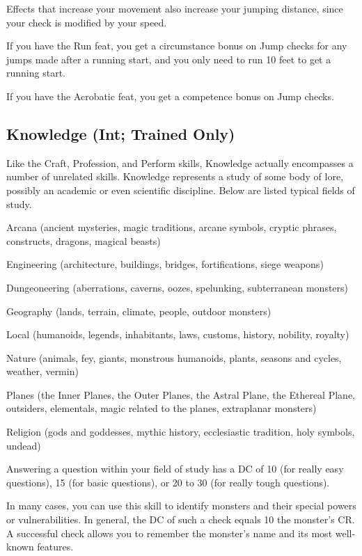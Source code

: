  Effects that increase your movement also increase your jumping distance, since your check is modified by your speed.

If you have the Run feat, you get a  circumstance bonus on Jump checks for
any jumps made after a running start, and you only need to run 10 feet to get a running start.

If you have the Acrobatic feat, you get a  competence bonus on Jump
checks.

\subsection{Knowledge (Int; Trained Only)}
Like the Craft, Profession, and Perform skills, Knowledge actually encompasses a number of unrelated skills. Knowledge represents a study of some body of lore, possibly an academic or even scientific discipline. Below are listed typical fields of study.
\begin{itemize*}
\item Arcana (ancient mysteries, magic traditions, arcane symbols,
cryptic phrases, constructs, dragons, magical beasts)
\item Engineering (architecture, buildings, bridges, fortifications, siege weapons)
\item Dungeoneering (aberrations, caverns, oozes, spelunking, subterranean monsters)
\item Geography (lands, terrain, climate, people, outdoor monsters)
\item Local (humanoids, legends, inhabitants, laws, customs, history, nobility, royalty)
\item Nature (animals, fey, giants, monstrous humanoids, plants, seasons and cycles, weather, vermin)
\item Planes (the Inner Planes, the Outer Planes, the Astral Plane,
the Ethereal Plane, outsiders, elementals, magic related to the planes, extraplanar monsters)
\item Religion (gods and goddesses, mythic history, ecclesiastic tradition, holy symbols, undead)
\end{itemize*}
 Answering a question within your field of study has a DC of 10 (for really easy questions), 15 (for basic questions), or 20 to 30 (for really tough questions).

In many cases, you can use this skill to identify monsters and their special powers or vulnerabilities. In general, the DC of such a check equals 10 \add the monster's CR. A successful check allows you to remember the monster's name and its most well-known features.

